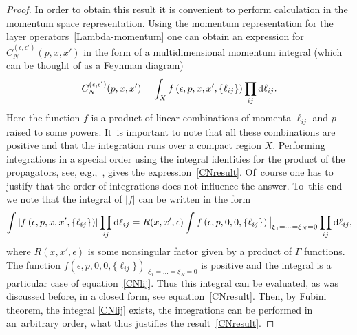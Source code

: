 \documentclass[pdftex]{sigma}%
\numberwithin{equation}{section}
\begin{document}
\begin{proof}
In order to obtain this result it is convenient to perform calculation in the momentum space representation. Using the momentum
representation for the layer operators~\eqref{Lambda-momentum} one can obtain an expression for $C_N^{( \epsilon, \epsilon')}(p, x, x')$ in
the form of a multidimensional momentum integral (which can be thought of as a Feynman diagram)
\begin{gather}\label{CNlij}
C_N^{( \epsilon, \epsilon')}(p,x, x')
 = \int_X f\left( \epsilon,p, x, x',\{\ell_{ij}\}\right) \prod_{ij}{\rm d}\ell_{ij}.
\end{gather}
Here the function $f$ is a product of linear combinations of momenta $\ell_{ij}$ and $p$ raised to some powers. It~is important to note
that all these combinations are positive and that the integration runs over a compact region $X$. Performing integrations in a special
order using the integral identities for the product of the propagators, see,
e.g.,~\cite{Derkachov:2003qb,Derkachov:2002tf,DMspinchainandSL2RGustafson}, gives the expression~\eqref{CNresult}. Of~course one
has to justify that the order of integrations does not influence the answer. To~this end we note that the integral of $|f|$ can be written
in the form
\begin{gather*}%
\int \left|f\left( \epsilon,p, x, x',\{\ell_{ij}\}\right)\right| \prod_{ij}{\rm d}\ell_{ij} =
R( x, x',\epsilon)\int f\left( \epsilon,p, 0, 0,\{\ell_{ij}\}\right)\big|_{\xi_1=\dots=\xi_N=0} \prod_{ij}{\rm d}\ell_{ij},
\end{gather*}
where $R( x, x',\epsilon)$ is some nonsingular factor given by a product of $\Gamma$ functions. The function $f\left(\epsilon,p, 0, 0,\{\ell_{ij}\}\right)\big|_{\xi_1=\dots=\xi_N=0}$ is positive and the integral is a particular case of equation~\eqref{CNlij}. Thus this integral can
be evaluated, as was discussed before, in a closed form, see equation~\eqref{CNresult}. Then, by Fubini theorem, the integral \eqref{CNlij}
exists, the integrations can be performed in an~arbi\-t\-rary order, what thus justifies the result~\eqref{CNresult}.




\end{proof}
\end{document}
